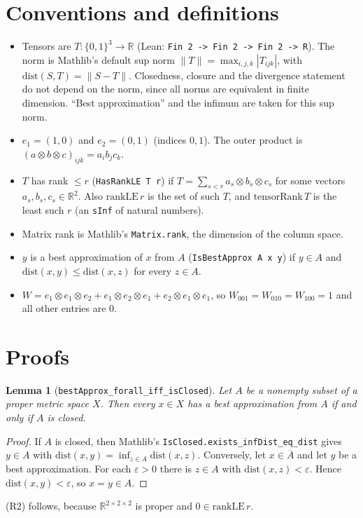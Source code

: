 \documentclass[11pt]{article}
\newtheorem{lemma}[theorem]{Lemma}
\theoremstyle{definition}
\newcommand{\R}{\mathbb{R}}
\begin{document}
\section*{Conventions and definitions}
\begin{itemize}
\item Tensors are $T:\{0,1\}^3\to\R$ (Lean: \texttt{Fin 2 -> Fin 2 -> Fin 2 -> R}). The norm
  is Mathlib's default sup norm $\|T\|=\max_{i,j,k}|T_{ijk}|$, with $\mathrm{dist}(S,T)=\|S-T\|$.
  Closedness, closure and the divergence statement do not depend on the norm, since all norms
  are equivalent in finite dimension. ``Best approximation'' and the infimum are taken for
  this sup norm.
\item $e_1=(1,0)$ and $e_2=(0,1)$ (indices $0,1$). The outer product is
  $(a\otimes b\otimes c)_{ijk}=a_ib_jc_k$.
\item $T$ has rank $\le r$ (\texttt{HasRankLE T r}) if $T=\sum_{s<r}a_s\otimes b_s\otimes c_s$
  for some vectors $a_s,b_s,c_s\in\R^2$. Also $\mathrm{rankLE}\,r$ is the set of such $T$, and
  $\mathrm{tensorRank}\,T$ is the least such $r$ (an \texttt{sInf} of natural numbers).
\item Matrix rank is Mathlib's \texttt{Matrix.rank}, the dimension of the column space.
\item $y$ is a best approximation of $x$ from $A$ (\texttt{IsBestApprox A x y}) if $y\in A$
  and $\mathrm{dist}(x,y)\le \mathrm{dist}(x,z)$ for every $z\in A$.
\item $W=e_1\otimes e_1\otimes e_2+e_1\otimes e_2\otimes e_1+e_2\otimes e_1\otimes e_1$, so
  $W_{001}=W_{010}=W_{100}=1$ and all other entries are $0$.
\end{itemize}

\section*{Proofs}
\begin{lemma}[\texttt{bestApprox\_forall\_iff\_isClosed}]
Let $A$ be a nonempty subset of a proper metric space $X$. Then every $x\in X$ has a best
approximation from $A$ if and only if $A$ is closed.
\end{lemma}
\begin{proof}
If $A$ is closed, then Mathlib's \texttt{IsClosed.exists\_infDist\_eq\_dist} gives $y\in A$
with $\mathrm{dist}(x,y)=\inf_{z\in A}\mathrm{dist}(x,z)$. Conversely, let $x\in\overline A$
and let $y$ be a best approximation. For each $\varepsilon>0$ there is $z\in A$ with
$\mathrm{dist}(x,z)<\varepsilon$. Hence $\mathrm{dist}(x,y)<\varepsilon$, so $x=y\in A$.
\end{proof}
(R2) follows, because $\R^{2\times2\times2}$ is proper and $0\in\mathrm{rankLE}\,r$.
\end{document}
